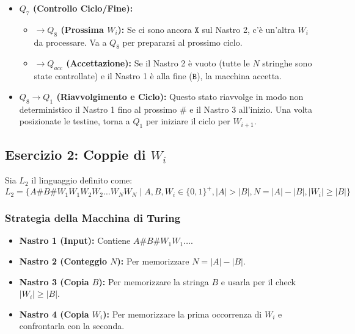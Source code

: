\documentclass[a4paper]{article}
\newcommand{\B}{\texttt{B}} %
\newcommand{\Sh}{\texttt{\#}} %
\newcommand{\X}{\texttt{X}} %
\begin{document}
\begin{itemize}
    \item \textbf{$Q_7$ (Controllo Ciclo/Fine):}
        \begin{itemize}
            \item \textbf{$\to Q_8$ (Prossima $W_i$):} Se ci sono ancora $\X$ sul Nastro 2, c'è un'altra $W_i$ da processare. Va a $Q_8$ per prepararsi al prossimo ciclo.
            \item \textbf{$\to Q_{acc}$ (Accettazione):} Se il Nastro 2 è vuoto (tutte le $N$ stringhe sono state controllate) e il Nastro 1 è alla fine ($\B$), la macchina accetta.
        \end{itemize}
    \item \textbf{$Q_8 \to Q_1$ (Riavvolgimento e Ciclo):} Questo stato riavvolge in modo non deterministico il Nastro 1 fino al prossimo $\Sh$ e il Nastro 3 all'inizio. Una volta posizionate le testine, torna a $Q_1$ per iniziare il ciclo per $W_{i+1}$.
\end{itemize}


\subsection{Esercizio 2: Coppie di $W_i$}

Sia $L_2$ il linguaggio definito come:
\[
L_2 = \{ A\Sh B\Sh W_1 W_1 W_2 W_2 \dots W_N W_N \mid A, B, W_i \in \{0,1\}^+, |A| > |B|, N = |A| - |B|, |W_i| \ge |B| \}
\]

\subsubsection{Strategia della Macchina di Turing}
\begin{itemize}
    \item \textbf{Nastro 1 (Input):} Contiene $A\Sh B\Sh W_1 W_1 \dots$.
    \item \textbf{Nastro 2 (Conteggio $N$):} Per memorizzare $N = |A| - |B|$.
    \item \textbf{Nastro 3 (Copia $B$):} Per memorizzare la stringa $B$ e usarla per il check $|W_i| \ge |B|$.
    \item \textbf{Nastro 4 (Copia $W_i$):} Per memorizzare la prima occorrenza di $W_i$ e confrontarla con la seconda.
\end{itemize}
\end{document}

